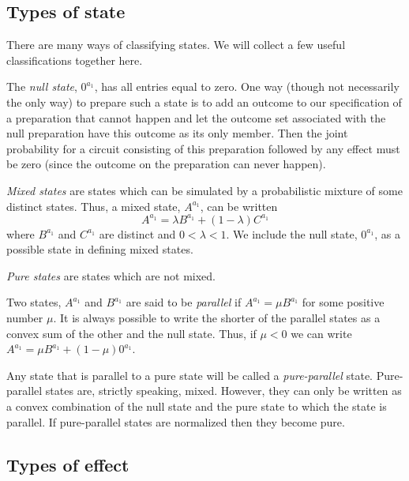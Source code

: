 \documentclass[10pt]{article}
\begin{document}
\subsection{Types of state}


There are many ways of classifying states.  We will collect a few useful classifications together here.


The \emph{null state}, $0^{a_1}$, has all entries equal to zero. One way (though not necessarily the only way) to prepare such a state is to add an outcome to our specification of a preparation that cannot happen and let the outcome set associated with the null preparation have this outcome as its only member.  Then the joint probability for a circuit consisting of this preparation followed by any effect must be zero (since the outcome on the preparation can never happen).



\emph{Mixed states} are states which can be simulated by a probabilistic mixture of some distinct states. Thus, a mixed state, $A^{a_1}$, can be written
\begin{equation}
A^{a_1} = \lambda B^{a_1} + (1-\lambda) C^{a_1}
\end{equation}
where $B^{a_1}$ and $C^{a_1}$ are distinct and $0<\lambda<1$.  We include the null state, $0^{a_1}$, as a possible state in defining mixed states.

\emph{Pure states} are states which are not mixed.

Two states, $A^{a_1}$ and $B^{a_1}$ are said to be \emph{parallel} if $A^{a_1}=\mu B^{a_1}$ for some positive number $\mu$. It is always possible to write the shorter of the parallel states as a convex sum of the other and the null state.  Thus, if $\mu<0$ we can write $A^{a_1}=\mu B^{a_1} +(1-\mu)0^{a_1}$.

Any state that is parallel to a pure state will be called a \emph{pure-parallel} state.  Pure-parallel states are, strictly speaking, mixed.  However, they can only be written as a convex combination of the null state and the pure state to which the state is parallel.  If pure-parallel states are normalized then they become pure.


\subsection{Types of effect}
\end{document}
